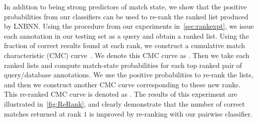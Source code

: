         \ConfusionMatch{}

        \EvalMetricsMatch{}

        \FloatBarrier{}

        In addition to being strong predictors of match state, we show that the positive probabilities from our
          classifiers can be used to re-rank the ranked list produced by LNBNN.
        Using the procedure from our experiments in~\cref{sec:rankexpt}, we issue each annotation in our testing
          set as a query and obtain a ranked list.
        Using the fraction of correct results found at each rank, we construct a cumulative match characteristic
          (CMC) curve~\cite{decann_relating_2013}.
        We denote this CMC curve as .
        Then we take each ranked lists and compute match-state probabilities for each top ranked pair of
          query/database annotations.
        We use the positive probabilities to re-rank the lists, and then we construct another CMC curve
          corresponding to these new ranks.
        This re-ranked CMC curve is denoted as .
        The results of this experiment are illustrated in~\cref{fig:ReRank}, and clearly demonstrate that the
          number of correct matches returned at rank $1$ is improved by re-ranking with our pairwise classifier.

        \ReRank{}
        
        \FloatBarrier{}
